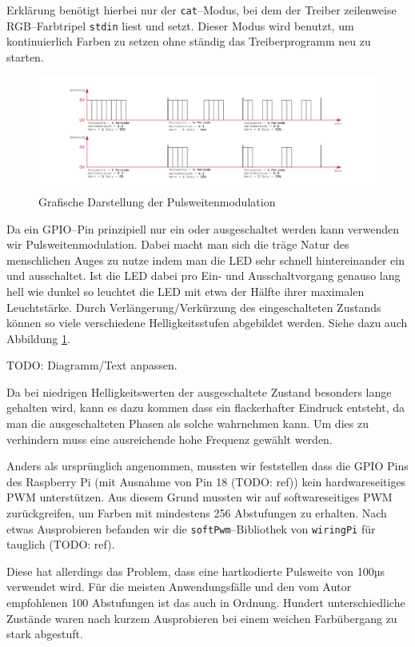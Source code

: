 \documentclass[11pt,ngerman,toc=listof,index=totoc]{scrreprt}
\begin{document}
Erklärung benötigt hierbei nur der \texttt{cat}--Modus, bei dem der
Treiber zeilenweise RGB--Farbtripel \texttt{stdin} liest und setzt.
Dieser Modus wird benutzt, um kontinuierlich Farben zu setzen ohne
ständig das Treiberprogramm neu zu starten.

\begin{figure}[h!]
  \centering
  \includegraphics[width=1.0\textwidth]{images/eulenfunk-pwm.png}
  \caption{Grafische Darstellung der Pulsweitenmodulation}
  \label{eulenfunk-pwm}
\end{figure}

Da ein GPIO--Pin prinzipiell nur ein oder ausgeschaltet werden kann
verwenden wir Pulsweitenmodulation. Dabei macht man sich die träge Natur
des menschlichen Auges zu nutze indem man die LED sehr schnell
hintereinander ein und ausschaltet. Ist die LED dabei pro Ein- und
Ausschaltvorgang genauso lang hell wie dunkel so leuchtet die LED mit
etwa der Hälfte ihrer maximalen Leuchtstärke. Durch
Verlängerung/Verkürzung des eingeschalteten Zustands können so viele
verschiedene Helligkeitsstufen abgebildet werden. Siehe dazu auch
Abbildung \ref{eulenfunk-pwm}.

TODO: Diagramm/Text anpassen.

Da bei niedrigen Helligkeitswerten der ausgeschaltete Zustand besonders
lange gehalten wird, kann es dazu kommen dass ein flackerhafter Eindruck
entsteht, da man die ausgeschalteten Phasen als solche wahrnehmen kann.
Um dies zu verhindern muss eine ausreichende hohe Frequenz gewählt
werden.

Anders als ursprünglich angenommen, mussten wir feststellen dass die
GPIO Pins des Raspberry Pi (mit Ausnahme von Pin 18 (TODO: ref)) kein
hardwareseitiges PWM unterstützen. Aus diesem Grund mussten wir auf
softwareseitiges PWM zurückgreifen, um Farben mit mindestens 256
Abstufungen zu erhalten. Nach etwas Ausprobieren befanden wir die
\texttt{softPwm}--Bibliothek von \texttt{wiringPi} für tauglich (TODO:
ref).

Diese hat allerdings das Problem, dass eine hartkodierte Pulsweite von
100µs verwendet wird. Für die meisten Anwendungsfälle und den vom Autor
empfohlenen 100 Abstufungen ist das auch in Ordnung. Hundert
unterschiedliche Zustände waren nach kurzem Ausprobieren bei einem
weichen Farbübergang zu stark abgestuft.
\end{document}
